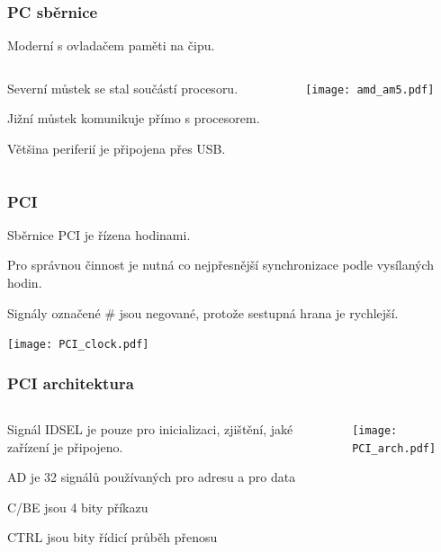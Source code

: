 \documentclass{beamer}
\begin{document}
\begin{frame}
\frametitle{PC sběrnice}

\begin{center}
Moderní s ovladačem paměti na čipu.
\end{center}

\begin{columns}
\begin{column}{0.4\textwidth}
Severní můstek se stal součástí procesoru.

\bigskip
Jižní můstek komunikuje přímo s procesorem.

\bigskip
Většina periferií je připojena přes USB.
\end{column}
\begin{column}{0.6\textwidth}  
\texttt{[image: amd\_am5.pdf]}
\end{column}
\end{columns}
\end{frame}

\begin{frame}
\frametitle{PCI}

Sběrnice PCI je řízena hodinami. 

Pro správnou činnost je nutná co nejpřesnější synchronizace podle vysílaných hodin.

Signály označené \# jsou negované, protože sestupná hrana je rychlejší.

\begin{center}  
\texttt{[image: PCI\_clock.pdf]}
\end{center}
\end{frame}

\begin{frame}
\frametitle{PCI architektura}

\begin{columns}
\begin{column}{0.35\textwidth}
Signál IDSEL je pouze pro inicializaci, zjištění, jaké zařízení je připojeno.

\bigskip
AD je 32 signálů používaných pro adresu a pro data

\bigskip
C/BE jsou 4 bity příkazu

\bigskip
CTRL jsou bity řídicí průběh přenosu
\end{column}
\begin{column}{0.6\textwidth}  
\texttt{[image: PCI\_arch.pdf]}
\end{column}
\end{columns}

\end{frame}
\end{document}
